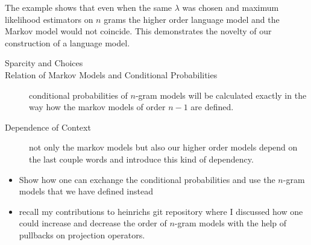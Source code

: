 \documentclass[•]{book}
\begin{document}
The example shows that even when the same $\lambda$ was chosen and maximum likelihood estimators on $n$ grams the higher order language model and the Markov model would not coincide. 
This demonstrates the novelty of our construction of a language model. 

\begin{remark}
\begin{description}
\item[Sparcity and Choices] 
\item[Relation of Markov Models and Conditional Probabilities] conditional probabilities of $n$-gram models will be calculated exactly in the way how the markov models of order $n-1$ are defined. 
\item[Dependence of Context] not only the markov models but also our higher order models depend on the last couple words and introduce this kind of dependency. 
\end{description}
\end{remark}


\begin{itemize}
\item Show how one can exchange the conditional probabilities and use the $n$-gram models that we have defined instead
\item recall my contributions to heinrichs git repository where I discussed how one could increase and decrease the order of $n$-gram models with the help of pullbacks on projection operators. 
\end{itemize}
\end{document}
